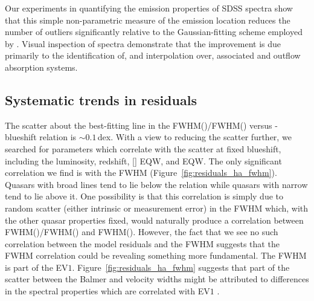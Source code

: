 Our experiments in quantifying the  emission properties of SDSS spectra show that this simple non-parametric measure of the  emission location reduces the number of outliers significantly relative to the Gaussian-fitting scheme employed by \citet{shen11}.
Visual inspection of spectra demonstrate that the improvement is due primarily to the identification of, and interpolation over, associated and outflow absorption systems.

\subsection{Systematic trends in residuals}
\label{sec:ch3-residuals}

The scatter about the best-fitting line in the FWHM()/FWHM(\hans) versus -blueshift relation is $\sim0.1$\,dex.
With a view to reducing the scatter further, we searched for parameters which correlate with the scatter at fixed  blueshift, including the luminosity, redshift, [] EQW, and  EQW.
The only significant correlation we find is with the \ha FWHM (Figure~\ref{fig:residuals_ha_fwhm}).
Quasars with broad \ha lines tend to lie below the relation while quasars with narrow \ha tend to lie above it.
One possibility is that this correlation is simply due to random scatter (either intrinsic or measurement error) in the \ha FWHM which, with the other quasar properties fixed, would naturally produce a correlation between FWHM()/FWHM(\hans) and FWHM(\hans).
However, the fact that we see no such correlation between the model residuals and the  FWHM suggests that the \ha FWHM correlation could be revealing something more fundamental.
The \ha FWHM is part of the \citet{boroson92} EV$1$.
Figure~\ref{fig:residuals_ha_fwhm} suggests that part of the scatter between the Balmer and  velocity widths might be attributed to differences in the spectral properties which are correlated with EV$1$ \citep{marziani13}.

